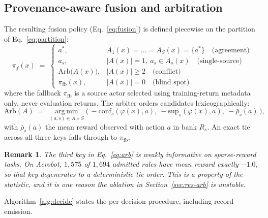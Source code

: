 \documentclass[11pt,a4paper]{article}
\newtheorem{remark}{Remark}
\begin{document}
\subsection{Provenance-aware fusion and arbitration}
\label{sec:method-fusion}

The resulting fusion policy (Eq.~\eqref{eq:fusion}) is defined piecewise on the partition of Eq.~\eqref{eq:partition}:
\begin{equation}
\label{eq:fusion}
\pi_{f}(x) \;=\;
\begin{cases}
a^{*}, & A_{1}(x)=\dots=A_{S}(x)=\{a^{*}\} \quad\text{(agreement)}\\[2pt]
a_{s}, & |A(x)|=1,\ a_{s}\in A_{s}(x) \quad\text{(single-source)}\\[2pt]
\mathrm{Arb}\bigl(A(x)\bigr), & |A(x)|\ge 2 \quad\text{(conflict)}\\[2pt]
\pi_{\mathrm{fb}}(x), & |A(x)|=0 \quad\text{(blind spot)}
\end{cases}
\end{equation}
where the fallback $\pi_{\mathrm{fb}}$ is a source actor selected using training-return metadata only, never evaluation returns. The arbiter orders candidates lexicographically:
\begin{equation}
\label{eq:arb}
\mathrm{Arb}(A) \;=\; \operatorname*{arg\,min}_{(a,s)\in A\times S}
\bigl(\,-\mathrm{conf}_{s}(\varphi(x),a),\ -\mathrm{sup}_{s}(\varphi(x),a),\ -\bar{\rho}_{s}(a)\,\bigr),
\end{equation}
with $\bar{\rho}_{s}(a)$ the mean reward observed with action $a$ in bank $R_{s}$. An exact tie across all three keys falls through to $\pi_{\mathrm{fb}}$.

\begin{remark}
\label{rem:degenerate}
The third key in Eq.~\eqref{eq:arb} is weakly informative on sparse-reward tasks. On Acrobot, $1{,}575$ of $1{,}694$ admitted rules have mean reward exactly $-1.0$, so that key degenerates to a deterministic tie order. This is a property of the statistic, and it is one reason the ablation in Section~\ref{sec:res-arb} is unstable.
\end{remark}

Algorithm~\ref{alg:decide} states the per-decision procedure, including record emission.
\end{document}
